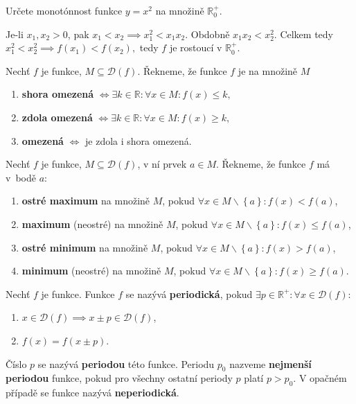 \begin{priklad}
Určete monotónnost funkce $y=x^2$ na množině $\mathbb R_0^+.$
\end{priklad}
\begin{reseni}
Je-li $x_1,x_2 >0$, pak $x_1 < x_2 \implies x_1^2 < x_1x_2.$ Obdobně $x_1x_2<x_2^2$.
Celkem tedy $x_1^2<x_2^2 \implies f(x_1)<f(x_2),$ tedy $f$ je rostoucí v $\mathbb R_0^+.$
\end{reseni}

\begin{definition}
  Nechť $f$ je funkce, $M\subseteq \mathcal D(f)$. Řekneme, že funkce $f$ je na množině $M$
  \begin{enumerate}[$i.$]
    \item \textbf{shora omezená} $\iff \exists k \in \mathbb R\colon \forall x \in M\colon f(x)\leq k,$
    \item \textbf{zdola omezená} $\iff \exists k \in \mathbb R\colon \forall x \in M\colon f(x)\geq k,$
    \item \textbf{omezená} $\iff $ je zdola i shora omezená.
  \end{enumerate}
\end{definition}

\begin{definition}
  Nechť $f$ je funkce, $M \subseteq \mathcal D(f)$, v ní prvek $a \in M$.
  Řekneme, že funkce $f$ má v~bodě $a$:
  \begin{enumerate}[$i.$]
    \item \textbf{ostré maximum} na množině $M$, pokud $\forall x \in M\smallsetminus \left \{ a \right \}  \colon f(x) < f(a)$,
    \item \textbf{maximum} (neostré) na množině $M$, pokud $\forall x \in M \smallsetminus \left \{ a \right \}\colon f(x) \leq f(a)$,
    \item \textbf{ostré minimum} na množině $M$, pokud $\forall x \in M\smallsetminus \left \{ a \right \}\colon f(x) > f(a)$,
    \item \textbf{minimum} (neostré) na množině $M$, pokud $\forall x \in M\smallsetminus \left \{ a \right \} \colon f(x) \geq f(a)$.
  \end{enumerate}
\end{definition}

\begin{definition}
  Nechť $f$ je funkce. Funkce $f$ se nazývá \textbf{periodická}, pokud $\exists p \in \mathbb R^{+}\colon \forall x \in \mathcal D(f)\colon$
  \begin{enumerate}
    \item $x \in \mathcal D(f) \implies x \pm p \in \mathcal D(f)$,
    \item $f(x) = f(x \pm p)$.
  \end{enumerate}
  Číslo $p$ se nazývá \textbf{periodou} této funkce. Periodu $p_0$ nazveme \textbf{nejmenší periodou} funkce, pokud pro všechny ostatní periody $p$ platí $p > p_0$. V opačném případě se funkce nazývá \textbf{neperiodická}.
\end{definition}

